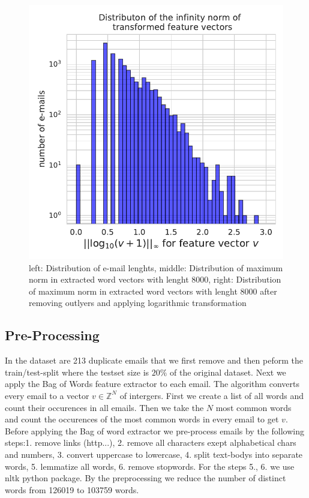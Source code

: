 \documentclass[11pt]{article}
\begin{document}
\begin{figure}
\begin{minipage}[t]{0.3\textwidth}
\end{minipage}
\begin{minipage}[t]{0.3\textwidth}
\includegraphics[width=1\linewidth]{email_spam/word_transformed_count.pdf}
\end{minipage}
   \caption{left: Distribution of e-mail lenghts, middle: Distribution of maximum norm in extracted word vectors with lenght 8000, right: Distribution of maximum norm in extracted word vectors with lenght 8000 after removing outlyers and applying logarithmic transformation}
\label{fig_fig0}
\end{figure}

\subsection{Pre-Processing}
In the dataset are 213 duplicate emails that we first remove and then peform the train/test-split where the testset size is $20\%$ of the original dataset. Next we apply the Bag of Words feature extractor to each email. The algorithm converts every email to a vector $v\in\mathbb{Z}^N$ of intergers. First we create a list of all words and count their occurences in all emails. Then we take the $N$ most common words and count the occurences of the most common words in every email to get $v$. Before applying the Bag of word extractor we pre-process emails by the following steps:1. remove links (http...), 2. remove all characters exept alphabetical chars and numbers, 3. convert uppercase to lowercase, 4. split text-bodys into separate words, 5. lemmatize all words, 6. remove stopwords. For the steps 5., 6. we use nltk python package. By the preprocessing we reduce the number of distinct words from 126019 to 103759 words. 
\end{document}
